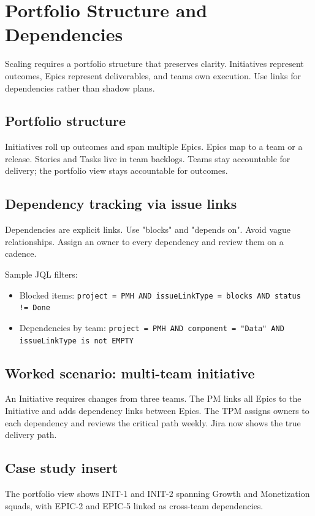 \section{Portfolio Structure and Dependencies}
Scaling requires a portfolio structure that preserves clarity. Initiatives represent outcomes, Epics represent deliverables, and teams own execution. Use links for dependencies rather than shadow plans.

\subsection{Portfolio structure}
Initiatives roll up outcomes and span multiple Epics. Epics map to a team or a release. Stories and Tasks live in team backlogs. Teams stay accountable for delivery; the portfolio view stays accountable for outcomes.

\subsection{Dependency tracking via issue links}
Dependencies are explicit links. Use "blocks" and "depends on". Avoid vague relationships. Assign an owner to every dependency and review them on a cadence.

Sample JQL filters:
\begin{itemize}
  \item Blocked items: \texttt{project = PMH AND issueLinkType = blocks AND status != Done}
  \item Dependencies by team: \texttt{project = PMH AND component = "Data" AND issueLinkType is not EMPTY}
\end{itemize}

\subsection{Worked scenario: multi-team initiative}
An Initiative requires changes from three teams. The PM links all Epics to the Initiative and adds dependency links between Epics. The TPM assigns owners to each dependency and reviews the critical path weekly. Jira now shows the true delivery path.

\subsection{Case study insert}
The portfolio view shows INIT-1 and INIT-2 spanning Growth and Monetization squads, with EPIC-2 and EPIC-5 linked as cross-team dependencies.
